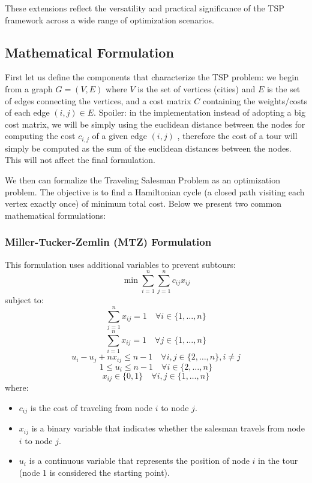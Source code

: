 \documentclass{article}
\begin{document}
These extensions reflect the versatility and practical significance of the TSP framework across a wide range of optimization scenarios.

\subsection{Mathematical Formulation}
First let us define the components that characterize the TSP problem: we begin from a graph $G = (V, E)$ where $V$ is the set of vertices (cities) and $E$ is the set of edges connecting the vertices, and a cost matrix $C$ containing the weights/costs of each edge $(i, j) \in E$. 
Spoiler: in the implementation instead of adopting a big cost matrix, we will be simply using the euclidean distance between the nodes for computing the cost $c_{i, j}$ of a given edge $(i, j)$ , therefore the cost of a tour will simply be computed as the sum of the euclidean distances between the nodes. This will not affect the final formulation.   

We then can formalize the Traveling Salesman Problem as an optimization problem. The objective is to find a Hamiltonian cycle (a closed path visiting each vertex exactly once) of minimum total cost. Below we present two common mathematical formulations:

\subsubsection{Miller-Tucker-Zemlin (MTZ) Formulation}
This formulation uses additional variables to prevent subtours:
\begin{equation}
	\min \sum_{i=1}^{n} \sum_{j=1}^{n} c_{ij} x_{ij}
\end{equation}
subject to:
\begin{equation}
	\sum_{j=1}^{n} x_{ij} = 1 \quad \forall i \in \{1, \ldots, n\}
\end{equation}
\begin{equation}
	\sum_{i=1}^{n} x_{ij} = 1 \quad \forall j \in \{1, \ldots, n\}
\end{equation}
\begin{equation}
	u_i - u_j + nx_{ij} \leq n-1 \quad \forall i,j \in \{2, \ldots, n\}, i \neq j
\end{equation}
\begin{equation}
	1 \leq u_i \leq n-1 \quad \forall i \in \{2, \ldots, n\}
\end{equation}
\begin{equation}
	x_{ij} \in \{0, 1\} \quad \forall i, j \in \{1, \ldots, n\}
\end{equation}
where:
\begin{itemize}
	\item $c_{ij}$ is the cost of traveling from node $i$ to node $j$.
	\item $x_{ij}$ is a binary variable that indicates whether the salesman travels from node $i$ to node $j$.
	\item $u_i$ is a continuous variable that represents the position of node $i$ in the tour (node 1 is considered the starting point).
\end{itemize}
\end{document}
